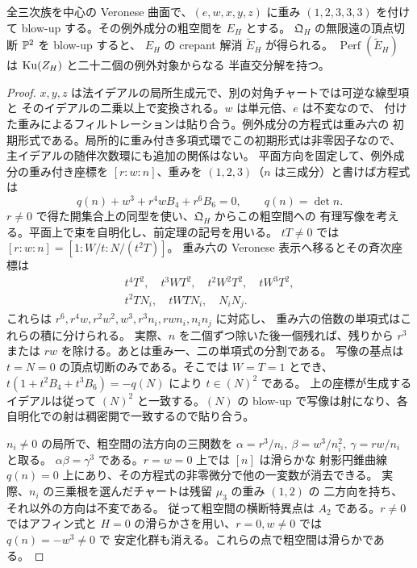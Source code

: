 \begin{proposition}[重み付き例外成分の解消]\label{vcd:prop:exceptional-resolution}
全三次族を中心の Veronese 曲面で、$(e,w,x,y,z)$ に重み $(1,2,3,3,3)$ を付けて
blow-up する。その例外成分の粗空間を $E_H$ とする。
$\mathfrak Q_H$ の無限遠の頂点切断 $\mathbb P^2$ を blow-up すると、
$E_H$ の crepant 解消 $\widetilde E_H$ が得られる。
$\operatorname{Perf}(\widetilde E_H)$ は $\operatorname{Ku}(Z_H)$ と二十二個の例外対象からなる
半直交分解を持つ。
\end{proposition}
\begin{proof}
$x,y,z$ は法イデアルの局所生成元で、別の対角チャートでは可逆な線型項と
そのイデアルの二乗以上で変換される。$w$ は単元倍、$e$ は不変なので、
付けた重みによるフィルトレーションは貼り合う。例外成分の方程式は重み六の
初期形式である。局所的に重み付き多項式環でこの初期形式は非零因子なので、
主イデアルの随伴次数環にも追加の関係はない。
平面方向を固定して、例外成分の重み付き座標を $[r:w:n]$、重みを
$(1,2,3)$（$n$ は三成分）と書けば方程式は
\[
 q(n)+w^3+r^4w B_4+r^6B_6=0,\qquad q(n)=\det n .
\]
$r\ne0$ で得た開集合上の同型を使い、$\mathfrak Q_H$ からこの粗空間への
有理写像を考える。平面上で束を自明化し、前定理の記号を用いる。
$tT\ne0$ では $[r:w:n]=[1:W/t:N/(t^2T)]$。
重み六の Veronese 表示へ移るとその斉次座標は
\[
 \begin{gathered}
 t^4T^2,\quad t^3WT^2,\quad t^2W^2T^2,\quad tW^3T^2,\\
 t^2T N_i,\quad tWT N_i,\quad N_iN_j .
 \end{gathered}
\]
これらは $r^6,r^4w,r^2w^2,w^3,r^3n_i,rwn_i,n_i n_j$ に対応し、
重み六の倍数の単項式はこれらの積に分けられる。
実際、$n$ を二個ずつ除いた後一個残れば、残りから $r^3$ または $rw$
を除ける。あとは重み一、二の単項式の分割である。
写像の基点は $t=N=0$ の頂点切断のみである。そこでは $W=T=1$ とでき、
$t(1+t^2B_4+t^3B_6)=-q(N)$ により $t\in(N)^2$ である。
上の座標が生成するイデアルは従って $(N)^2$ と一致する。$(N)$ の
blow-up で写像は射になり、各自明化での射は稠密開で一致するので貼り合う。

$n_i\ne0$ の局所で、粗空間の法方向の三関数を
$\alpha=r^3/n_i,\ \beta=w^3/n_i^2,\ \gamma=rw/n_i$ と取る。
$\alpha\beta=\gamma^3$ である。$r=w=0$ 上では $[n]$ は滑らかな
射影円錐曲線 $q(n)=0$ 上にあり、その方程式の非零微分で他の一変数が消去できる。
実際、$n_i$ の三乗根を選んだチャートは残留 $\mu_3$ の重み $(1,2)$ の
二方向を持ち、それ以外の方向は不変である。
従って粗空間の横断特異点は $A_2$ である。$r\ne0$ ではアフィン式と
$H=0$ の滑らかさを用い、$r=0,w\ne0$ では $q(n)=-w^3\ne0$ で
安定化群も消える。これらの点で粗空間は滑らかである。


\end{proof}
